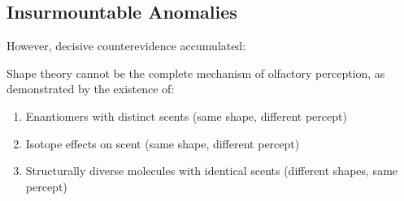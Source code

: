 \subsection{Insurmountable Anomalies}

However, decisive counterevidence accumulated:

\begin{theorem}
\label{thm:shape_incompleteness}
Shape theory cannot be the complete mechanism of olfactory perception, as demonstrated by the existence of:
\begin{enumerate}
\item Enantiomers with distinct scents (same shape, different percept)
\item Isotope effects on scent (same shape, different percept)
\item Structurally diverse molecules with identical scents (different shapes, same percept)
\end{enumerate}
\end{theorem}

